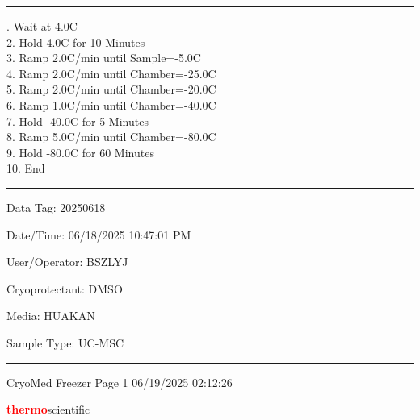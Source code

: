 \documentclass[UTF8,10pt,a4paper,fontset=fandol]{ctexart}
\newcommand{\fieldvalue}[1]{#1}
\begin{document}
\noindent
\begin{minipage}[t]{0.47\linewidth}
\hrule
{}. Wait at 4.0\textdegree C\\
2. Hold 4.0\textdegree C for 10 Minutes\\
3. Ramp 2.0\textdegree C/min until Sample=-5.0\textdegree C\\
4. Ramp 2.0\textdegree C/min until Chamber=-25.0\textdegree C\\
5. Ramp 2.0\textdegree C/min until Chamber=-20.0\textdegree C\\
6. Ramp 1.0\textdegree C/min until Chamber=-40.0\textdegree C\\
7. Hold -40.0\textdegree C for 5 Minutes\\
8. Ramp 5.0\textdegree C/min until Chamber=-80.0\textdegree C\\
9. Hold -80.0\textdegree C for 60 Minutes\\
10. End
\end{minipage}
\hfill
\begin{minipage}[t]{0.47\linewidth}
\hrule
\smallskip
Data Tag:
\fieldvalue{20250618}

\noindent
Date/Time:
\fieldvalue{06/18/2025 10:47:01 PM}

\noindent
User/Operator:
\fieldvalue{BSZLYJ}

\noindent
Cryoprotectant:
\fieldvalue{DMSO}

\noindent
Media:
\fieldvalue{HUAKAN}

\noindent
Sample Type:
\fieldvalue{UC-MSC}
\end{minipage}

\vfill
\noindent\rule{\linewidth}{0.4pt}

\noindent
CryoMed Freezer
\hfill Page 1
\hfill 06/19/2025 02:12:26

\newpage

\begin{flushright}
\textcolor{red}{\textsf{\textbf{thermo}}}\textsf{scientific}
\end{flushright}
\end{document}
